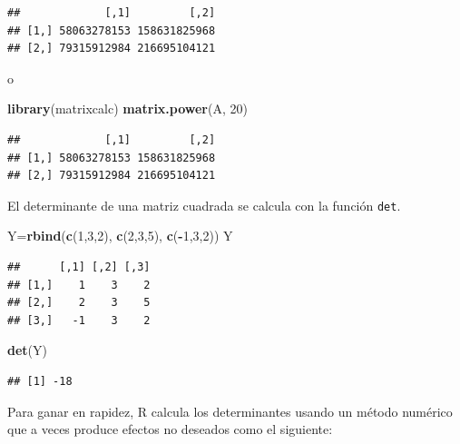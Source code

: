 \documentclass[]{book}
\newenvironment{Shaded}{\begin{snugshade}}{\end{snugshade}}
\newcommand{\DecValTok}[1]{\textcolor[rgb]{0.00,0.00,0.81}{#1}}
\newcommand{\KeywordTok}[1]{\textcolor[rgb]{0.13,0.29,0.53}{\textbf{#1}}}
\newcommand{\NormalTok}[1]{#1}
\newcommand{\OperatorTok}[1]{\textcolor[rgb]{0.81,0.36,0.00}{\textbf{#1}}}
\theoremstyle{definition}
\theoremstyle{definition}
\theoremstyle{definition}
\theoremstyle{remark}
\begin{document}
\begin{verbatim}
##             [,1]         [,2]
## [1,] 58063278153 158631825968
## [2,] 79315912984 216695104121
\end{verbatim}

o

\begin{Shaded}
\begin{Highlighting}[]
\KeywordTok{library}\NormalTok{(matrixcalc)}
\KeywordTok{matrix.power}\NormalTok{(A, }\DecValTok{20}\NormalTok{)}
\end{Highlighting}
\end{Shaded}

\begin{verbatim}
##             [,1]         [,2]
## [1,] 58063278153 158631825968
## [2,] 79315912984 216695104121
\end{verbatim}

El determinante de una matriz cuadrada se calcula con la función \texttt{det}.

\begin{Shaded}
\begin{Highlighting}[]
\NormalTok{Y=}\KeywordTok{rbind}\NormalTok{(}\KeywordTok{c}\NormalTok{(}\DecValTok{1}\NormalTok{,}\DecValTok{3}\NormalTok{,}\DecValTok{2}\NormalTok{), }\KeywordTok{c}\NormalTok{(}\DecValTok{2}\NormalTok{,}\DecValTok{3}\NormalTok{,}\DecValTok{5}\NormalTok{), }\KeywordTok{c}\NormalTok{(}\OperatorTok{-}\DecValTok{1}\NormalTok{,}\DecValTok{3}\NormalTok{,}\DecValTok{2}\NormalTok{))}
\NormalTok{Y}
\end{Highlighting}
\end{Shaded}

\begin{verbatim}
##      [,1] [,2] [,3]
## [1,]    1    3    2
## [2,]    2    3    5
## [3,]   -1    3    2
\end{verbatim}

\begin{Shaded}
\begin{Highlighting}[]
\KeywordTok{det}\NormalTok{(Y)}
\end{Highlighting}
\end{Shaded}

\begin{verbatim}
## [1] -18
\end{verbatim}

Para ganar en rapidez, R calcula los determinantes usando un método numérico que a veces produce efectos no deseados como el siguiente:
\end{document}
